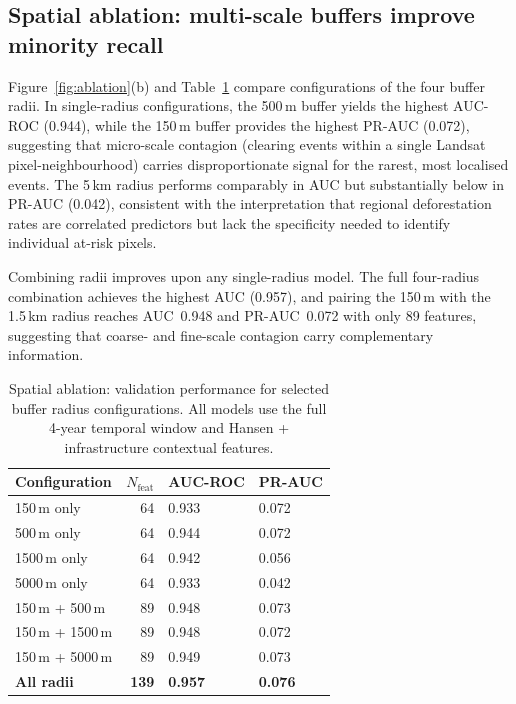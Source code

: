 \documentclass{iopart}
\begin{document}
\subsection{Spatial ablation: multi-scale buffers improve minority recall}

Figure~\ref{fig:ablation}(b) and Table~\ref{tab:spatial} compare
configurations of the four buffer radii.
In single-radius configurations, the 500\,m buffer yields the highest
AUC-ROC (0.944), while the 150\,m buffer provides the highest PR-AUC
(0.072), suggesting that micro-scale contagion (clearing events within
a single Landsat pixel-neighbourhood) carries disproportionate signal
for the rarest, most localised events.
The 5\,km radius performs comparably in AUC but substantially below
in PR-AUC (0.042), consistent with the interpretation that regional
deforestation rates are correlated predictors but lack the specificity
needed to identify individual at-risk pixels.

Combining radii improves upon any single-radius model.
The full four-radius combination achieves the highest AUC (0.957),
and pairing the 150\,m with the 1.5\,km radius
reaches AUC~0.948 and PR-AUC~0.072 with only 89 features,
suggesting that coarse- and fine-scale contagion carry complementary
information.

\begin{table}[htb]
\caption{\label{tab:spatial}
Spatial ablation: validation performance for selected buffer
radius configurations.
All models use the full 4-year temporal window and Hansen + infrastructure
contextual features.}
\begin{center}
\begin{tabular}{lrll}
\toprule
Configuration & $N_\mathrm{feat}$ & AUC-ROC & PR-AUC \\
\midrule
150\,m only   & 64 & 0.933 & 0.072 \\
500\,m only   & 64 & 0.944 & 0.072 \\
1500\,m only  & 64 & 0.942 & 0.056 \\
5000\,m only  & 64 & 0.933 & 0.042 \\
150\,m + 500\,m  & 89 & 0.948 & 0.073 \\
150\,m + 1500\,m & 89 & 0.948 & 0.072 \\
150\,m + 5000\,m & 89 & 0.949 & 0.073 \\
\textbf{All radii}
                 & \textbf{139} & \textbf{0.957} & \textbf{0.076} \\
\bottomrule
\end{tabular}
\end{center}
\end{table}
\end{document}
